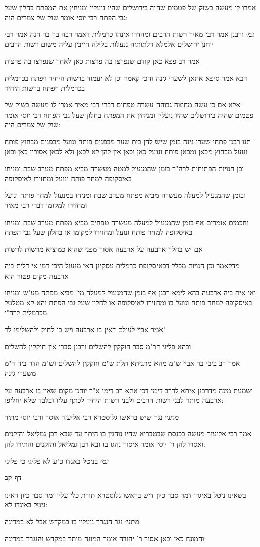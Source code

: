 \documentclass[12pt, openany]{book}
\newcommand{\sethebfont}{
\fontsize{10.5pt}{21.0pt} \selectfont
}
\newcommand{\textblock}[1]{
{\sethebfont #1\\}	
}
\newcommand{\sectname}{}
\newcommand{\newsection}[1]{
	\addcontentsline{toc}{section}{#1}
	\renewcommand{\sectname}{#1}	
	\vspace{-\baselineskip}
	\begin{center}
		\textbf{%
\fontsize{16pt}{16pt}\selectfont
			#1}
	\end{center}
	\vspace{-\baselineskip}
	\nopagebreak
}
\begin{document}
\textblock{אמרו לו מעשה בשוק של פטמים שהיה בירושלים שהיו נועלין ומניחין את המפתח בחלון שעל גבי הפתח רבי יוסי אומר שוק של צמרים הוה:}
\textblock{{\large\emph{גמ׳}} ורבנן אמר רבי מאיר רשות הרבים ומהדרו אינהו כרמלית דאמר רבה בר בר חנה אמר רבי יוחנן ירושלים אלמלא דלתותיה ננעלות בלילה חייבין עליה משום רשות הרבים}
\textblock{אמר רב פפא כאן קודם שנפרצו בה פרצות כאן לאחר שנפרצו בה פרצות}
\textblock{רבא אמר סיפא אתאן לשערי גינה והכי קאמר וכן לא יעמוד ברשות היחיד ויפתח בכרמלית בכרמלית ויפתח ברשות היחיד}
\textblock{אלא אם כן עשה מחיצה גבוהה עשרה טפחים דברי רבי מאיר אמרו לו מעשה בשוק של פטמים שהיה בירושלים שהיו נועלין ומניחין את המפתח בחלון שעל גבי הפתח רבי יוסי אומר שוק של צמרים היה:}
\textblock{תנו רבנן פתחי שערי גינה בזמן שיש להן בית שער מבפנים פותח ונועל מבפנים מבחוץ פותח ונועל מבחוץ מכאן ומכאן פותח ונועל כאן וכאן אין להן לא לכאן ולא לכאן אסורין כאן וכאן}
\textblock{וכן חנויות הפתוחות לרה"ר בזמן שהמנעול למטה מעשרה מביא מפתח מערב שבת ומניחו באיסקופה למחר פותח ונועל ומחזירו לאיסקופה}
\textblock{ובזמן שהמנעול למעלה מעשרה מביא מפתח מערב שבת ומניחו במנעול למחר פותח ונועל ומחזירו למקומו דברי רבי מאיר}
\textblock{וחכמים אומרים אף בזמן שהמנעול למעלה מעשרה טפחים מביא מפתח מערב שבת ומניחו באיסקופה למחר פותח ונועל ומחזירו למקומו או בחלון שעל גבי הפתח}
\textblock{אם יש בחלון ארבעה על ארבעה אסור מפני שהוא כמוציא מרשות לרשות}
\textblock{מדקאמר וכן חנויות מכלל דבאיסקופת כרמלית עסקינן האי מנעול היכי דמי אי דלית ביה ארבעה מקום פטור הוא}
\textblock{ואי אית ביה ארבעה בהא לימא רבנן אף בזמן שהמנעול למעלה מי' מביא מפתח מע"ש ומניחו באיסקופה למחר פותח ונועל בו ומחזירו לאיסקופה או לחלון שעל גבי הפתח והא קא מטלטל מכרמלית לרה"י}
\textblock{אמר אביי לעולם דאין בו ארבעה ויש בו לחוק ולהשלימו לד'}
\textblock{ובהא פליגי דר"מ סבר חוקקין להשלים ורבנן סברי אין חוקקין להשלים}
\textblock{אמר רב ביבי בר אביי ש"מ מהא מתניתא תלת ש"מ חוקקין להשלים וש"מ הדר ביה ר"מ משערי גינה}
\textblock{ושמעת מינה מדרבנן איתא לדרב דימי דכי אתא רב דימי א"ר יוחנן מקום שאין בו ארבעה על ארבעה מותר לבני רשות הרבים ולבני רשות היחיד לכתף עליו ובלבד שלא יחליפו:}
\textblock{{\large\emph{מתני׳}} נגר שיש בראשו גלוסטרא רבי אליעזר אוסר ורבי יוסי מתיר}
\textblock{אמר רבי אליעזר מעשה בכנסת שבטבריא שהיו נוהגין בו היתר עד שבא רבן גמליאל והזקנים ואסרו להן ר' יוסי אומר איסור נהגו בו ובא רבן גמליאל והזקנים והתירו להן:}
\textblock{{\large\emph{גמ׳}} בניטל באגדו כ"ע לא פליגי כי פליגי}
\newsection{דף קב}
\textblock{בשאינו ניטל באיגדו דמר סבר כיון דיש בראשו גלוסטרא תורת כלי עליו ומר סבר כיון דאינו ניטל באיגדו לא:}
\textblock{{\large\emph{מתני׳}} נגר הנגרר נועלין בו במקדש אבל לא במדינה}
\textblock{והמונח כאן וכאן אסור ר' יהודה אומר המונח מותר במקדש והנגרר במדינה:}
\end{document}

